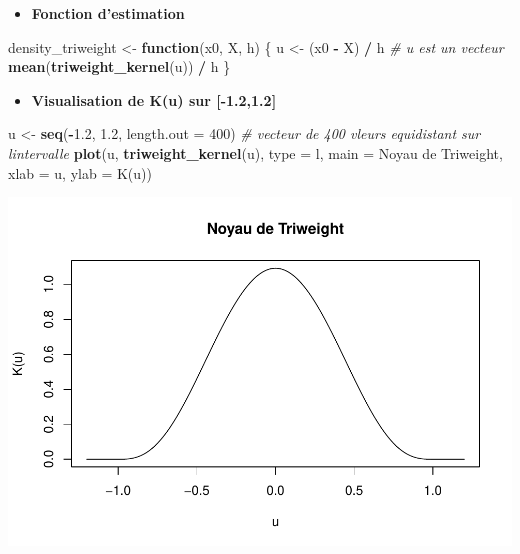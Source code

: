 \documentclass[
  12pt,
]{article}
\newenvironment{Shaded}{\begin{snugshade}}{\end{snugshade}}
\newcommand{\AttributeTok}[1]{\textcolor[rgb]{0.13,0.29,0.53}{#1}}
\newcommand{\CommentTok}[1]{\textcolor[rgb]{0.56,0.35,0.01}{\textit{#1}}}
\newcommand{\ControlFlowTok}[1]{\textcolor[rgb]{0.13,0.29,0.53}{\textbf{#1}}}
\newcommand{\DecValTok}[1]{\textcolor[rgb]{0.00,0.00,0.81}{#1}}
\newcommand{\FloatTok}[1]{\textcolor[rgb]{0.00,0.00,0.81}{#1}}
\newcommand{\FunctionTok}[1]{\textcolor[rgb]{0.13,0.29,0.53}{\textbf{#1}}}
\newcommand{\NormalTok}[1]{#1}
\newcommand{\OtherTok}[1]{\textcolor[rgb]{0.56,0.35,0.01}{#1}}
\newcommand{\SpecialCharTok}[1]{\textcolor[rgb]{0.81,0.36,0.00}{\textbf{#1}}}
\newcommand{\StringTok}[1]{\textcolor[rgb]{0.31,0.60,0.02}{#1}}
\providecommand{\tightlist}{%
  \setlength{\itemsep}{0pt}\setlength{\parskip}{0pt}}
\begin{document}
\begin{itemize}
\tightlist
\item
  \textbf{Fonction d'estimation}
\end{itemize}

\begin{Shaded}
\begin{Highlighting}[]
\NormalTok{density\_triweight }\OtherTok{\textless{}{-}} \ControlFlowTok{function}\NormalTok{(x0, X, h) \{}
\NormalTok{  u }\OtherTok{\textless{}{-}}\NormalTok{ (x0 }\SpecialCharTok{{-}}\NormalTok{ X) }\SpecialCharTok{/}\NormalTok{ h }\CommentTok{\# u est un vecteur}
  \FunctionTok{mean}\NormalTok{(}\FunctionTok{triweight\_kernel}\NormalTok{(u)) }\SpecialCharTok{/}\NormalTok{ h}
\NormalTok{\}}
\end{Highlighting}
\end{Shaded}

\begin{itemize}
\tightlist
\item
  \textbf{Visualisation de K(u) sur {[}-1.2,1.2{]}}
\end{itemize}

\begin{Shaded}
\begin{Highlighting}[]
\NormalTok{u }\OtherTok{\textless{}{-}} \FunctionTok{seq}\NormalTok{(}\SpecialCharTok{{-}}\FloatTok{1.2}\NormalTok{, }\FloatTok{1.2}\NormalTok{, }\AttributeTok{length.out =} \DecValTok{400}\NormalTok{) }\CommentTok{\# vecteur de 400 vleurs equidistant sur l\textquotesingle{}intervalle}
\FunctionTok{plot}\NormalTok{(u, }\FunctionTok{triweight\_kernel}\NormalTok{(u), }\AttributeTok{type =} \StringTok{\textquotesingle{}l\textquotesingle{}}\NormalTok{,}
     \AttributeTok{main =} \StringTok{\textquotesingle{}Noyau de Triweight\textquotesingle{}}\NormalTok{, }\AttributeTok{xlab =} \StringTok{\textquotesingle{}u\textquotesingle{}}\NormalTok{, }\AttributeTok{ylab =} \StringTok{\textquotesingle{}K(u)\textquotesingle{}}\NormalTok{)}
\end{Highlighting}
\end{Shaded}

\includegraphics{Stat_non_para_files/figure-latex/unnamed-chunk-158-1.pdf}
\end{document}
